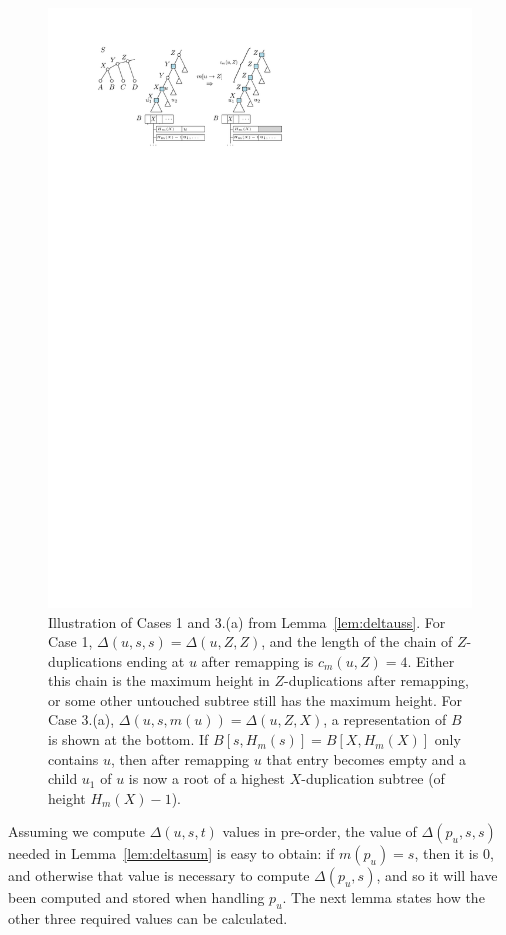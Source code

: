 \documentclass[10pt]{article}
\begin{document}
\begin{figure}
    \centering
    \includegraphics[width=0.65\linewidth]{figs_theory/cmu.pdf}
    \caption{Illustration of Cases 1 and 3.(a) from Lemma~\ref{lem:deltauss}. 
    For Case 1, $\Delta(u, s, s) = \Delta(u, Z, Z)$, and the length of the chain of $Z$-duplications ending at $u$ after remapping is $c_m(u, Z) = 4$.  Either this chain is the maximum height in $Z$-duplications after remapping, or some other untouched subtree still has the maximum height.  For Case 3.(a), $\Delta(u, s, m(u)) = \Delta(u, Z, X)$, a representation of $B$ is shown at the bottom.  If $B[s, H_m(s)] = B[X, H_m(X)]$ only contains $u$, then after remapping $u$ that entry becomes empty and a child $u_1$ of $u$ is now a root of a highest $X$-duplication subtree (of height $H_m(X) - 1$).}
    \label{fig:deltacases}
\end{figure}





Assuming we compute $\Delta(u, s, t)$ values in pre-order, the value of $\Delta(p_u, s, s)$ needed in Lemma~\ref{lem:deltasum} is easy to obtain: if $m(p_u) = s$, then it is $0$, and otherwise that value is necessary to compute $\Delta(p_u, s)$, and so it will have been computed and stored when handling $p_u$.  The next lemma states how the other three required values can be calculated.
\end{document}
